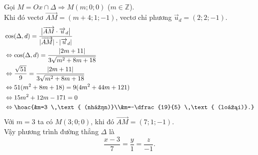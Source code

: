\begin{ex}
{\begin{align*}
		\end{align*}
		Gọi $M = Ox \cap \Delta  \Rightarrow M(m;0;0)$ ($m\in\mathbb{Z}$).\\
		Khi đó vectơ $\overrightarrow{AM} = (m+4;1;-1)$,  vectơ chỉ phương $\overrightarrow{u}_{d} = (2;2;-1)$.
		\begin{align*}
			&\cos(\Delta,d) 
			= \dfrac{\big|\overrightarrow{AM}\cdot  \overrightarrow{u}_{d}\big|}{|\overrightarrow{AM}|\cdot|\overrightarrow{u}_{d}|}\\
			&\Leftrightarrow\cos(\Delta,d) =  \dfrac{|2m+11|}{3\sqrt{m^2+8m+18}}\\
			 &\Leftrightarrow
			 \dfrac{\sqrt{51}}{9}
			= \dfrac{|2m+11|}{3\sqrt{m^2+8m+18}}\\ 
			&\Leftrightarrow 
			51(m^2+8m+18) 
			 = 9(4m^2+44m+121)\\
			&\Leftrightarrow 
			 15m^2+12m-171=0\\
			&\Leftrightarrow\hoac{&m=3 \,\text{ (nhận)}\\&m=-\dfrac{19}{5} \,\text{  (loại)}.}
		\end{align*}
		Với $m=3$ ta  có $M(3;0;0)$, khi đó $\overrightarrow{AM} = (7;1;-1)$.\\
		Vậy phương trình đường  thẳng $\Delta$ là
		\[ 
		\dfrac{x-3}{7} = \dfrac{y}{1}  = \dfrac{z}{-1}.
		 \]
	 }
\end{ex}

